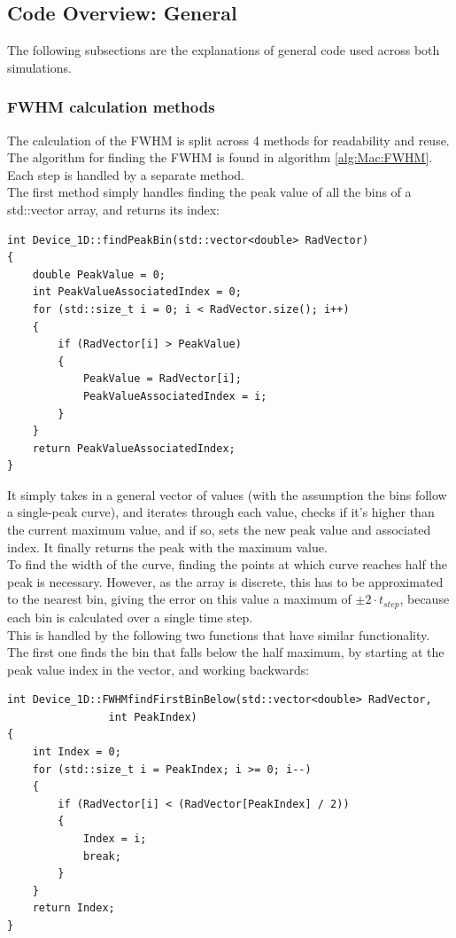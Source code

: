 \documentclass[titlepage]{article}
\begin{document}
\subsection{Code Overview: General}
The following subsections are the explanations of general code used across both simulations.
\subsubsection{FWHM calculation methods}
The calculation of the FWHM is split across 4 methods for readability and reuse. The algorithm for finding the FWHM is found in algorithm \ref{alg:Mac:FWHM}. Each step is handled by a separate method. \\ 
The first method simply handles finding the peak value of all the bins of a std::vector array, and returns its index:
\begin{lstlisting}[caption = Method for finding histogram peak bin]
int Device_1D::findPeakBin(std::vector<double> RadVector)
{
	double PeakValue = 0;
	int PeakValueAssociatedIndex = 0;
	for (std::size_t i = 0; i < RadVector.size(); i++)
	{
		if (RadVector[i] > PeakValue)
		{
			PeakValue = RadVector[i];
			PeakValueAssociatedIndex = i;
		}
	}
	return PeakValueAssociatedIndex;
}
\end{lstlisting}
It simply takes in a general vector of values (with the assumption the bins follow a single-peak curve), and iterates through each value, checks if it's higher than the current maximum value, and if so, sets the new peak value and associated index. It finally returns the peak with the maximum value.\\
To find the width of the curve, finding the points at which curve reaches half the peak is necessary. However, as the array is discrete, this has to be approximated to the nearest bin, giving the error on this value a maximum of $\pm 2\cdot t_{step}$, because each bin is calculated over a single time step.\\
 This is handled by the following two functions that have similar functionality. The first one finds the bin that falls below the half maximum, by starting at the peak value index in the vector, and working backwards:
\begin{lstlisting}[caption = Method for finding first bin to fall below half peak before peak]
int Device_1D::FWHMfindFirstBinBelow(std::vector<double> RadVector, 
				int PeakIndex)
{
	int Index = 0;
	for (std::size_t i = PeakIndex; i >= 0; i--)
	{
		if (RadVector[i] < (RadVector[PeakIndex] / 2))
		{
			Index = i;
			break;
		}
	}
	return Index;
}
\end{lstlisting}
\end{document}
